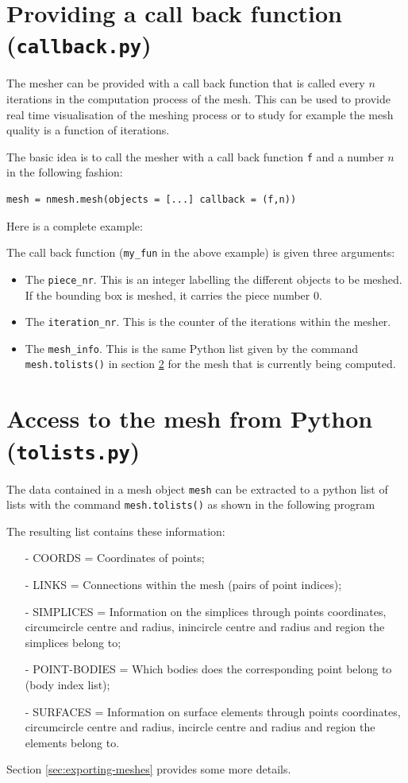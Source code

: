 \documentclass[10pt,a4paper]{book}
\newcommand{\py}[1]{\texttt{\color{blue}#1}}
\begin{document}
\section{Providing a call back function (\texttt{callback.py})}

\lstset{basicstyle=\ttfamily}
The mesher can be provided with a call back function that is called
every $n$ iterations in the computation process of the mesh. This can
be used to provide real time visualisation of the meshing process or
to study for example the mesh quality is a function of iterations.

The basic idea is to call the mesher with a call back function \py{f} and a number $n$ in the following fashion:
\begin{lstlisting}
mesh = nmesh.mesh(objects = [...] callback = (f,n))  
\end{lstlisting}

Here is a complete example:


The call back function (\py{my\_fun} in the above example) is given three arguments:
\begin{itemize}
\item The \py{piece\_nr}. This is an integer labelling the different objects to be meshed. If the bounding box is meshed, it carries the piece number 0.
\item The \py{iteration\_nr}. This is the counter of the iterations within the mesher.
\item The \py{mesh\_info}. This is the same Python list given by the command
  \py{mesh.tolists()} in section \ref{sec:tolists} for the mesh that is currently being computed. 
\end{itemize}

\section{Access to the mesh from Python (\texttt{tolists.py})}
\label{sec:tolists}
The data contained in a mesh object \texttt{mesh} can be extracted to
a python list of lists with the command \py{mesh.tolists()} as shown
in the following program


The resulting list contains these information:
\begin{itemize}
  \item[-] COORDS = Coordinates of points;
  \item[-] LINKS = Connections within the mesh (pairs of point indices);
  \item[-] SIMPLICES = Information on the simplices through points
    coordinates, circumcircle centre and radius, inincircle centre and
    radius and region the simplices belong to;
   \item[-] POINT-BODIES = Which bodies does the corresponding point
     belong to (body index list); 
   \item[-] SURFACES = Information on surface elements through points
     coordinates, circumcircle centre and radius, incircle centre and
     radius and region the elements belong to.
\end{itemize}
Section \ref{sec:exporting-meshes} provides some more details.
\end{document}
